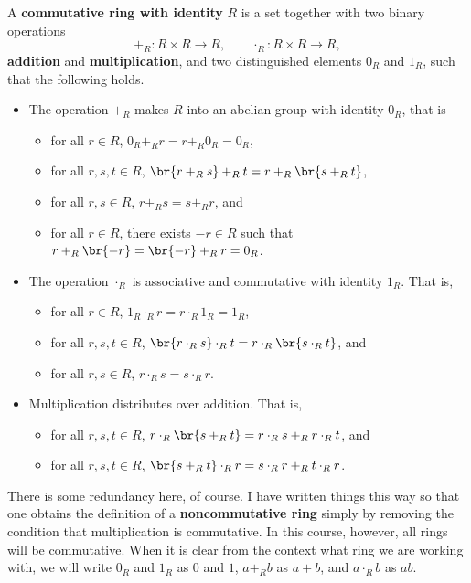 \begin{definition}
A \textbf{commutative ring with identity} $ R $ is a set together with two binary operations
$$ +_R : R \times R \to R, \qquad \cdot_R : R \times R \to R, $$
\textbf{addition} and \textbf{multiplication}, and two distinguished elements $ 0_R $ and $ 1_R $, such that the following holds.
\begin{itemize}
\item The operation $ +_R $ makes $ R $ into an abelian group with identity $ 0_R $, that is
\begin{itemize}
\item for all $ r \in R $, $ 0_R +_R r = r +_R 0_R = 0_R $,
\item for all $ r, s, t \in R $, $ \br{r +_R s} +_R t = r +_R \br{s +_R t} $,
\item for all $ r, s \in R $, $ r +_R s = s +_R r $, and
\item for all $ r \in R $, there exists $ -r \in R $ such that $ r +_R \br{-r} = \br{-r} +_R r = 0_R $.
\end{itemize}
\item The operation $ \cdot_R $ is associative and commutative with identity $ 1_R $. That is,
\begin{itemize}
\item for all $ r \in R $, $ 1_R \cdot_R r = r \cdot_R 1_R = 1_R $,
\item for all $ r, s, t \in R $, $ \br{r \cdot_R s} \cdot_R t = r \cdot_R \br{s \cdot_R t} $, and
\item for all $ r, s \in R $, $ r \cdot_R s = s \cdot_R r $.
\end{itemize}
\item Multiplication distributes over addition. That is,
\begin{itemize}
\item for all $ r, s, t \in R $, $ r \cdot_R \br{s +_R t} = r \cdot_R s +_R r \cdot_R t $, and
\item for all $ r, s, t \in R $, $ \br{s +_R t} \cdot_R r = s \cdot_R r +_R t \cdot_R r $.
\end{itemize}
\end{itemize}
\end{definition}

There is some redundancy here, of course. I have written things this way so that one obtains the definition of a \textbf{noncommutative ring} simply by removing the condition that multiplication is commutative. In this course, however, all rings will be commutative. When it is clear from the context what ring we are working with, we will write $ 0_R $ and $ 1_R $ as $ 0 $ and $ 1 $, $ a +_R b $ as $ a + b $, and $ a \cdot_R b $ as $ ab $.

